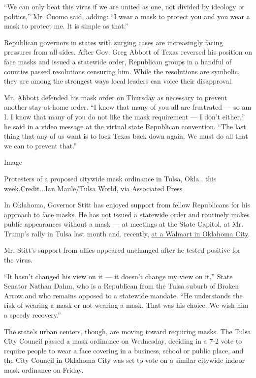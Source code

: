 ``We can only beat this virus if we are united as one, not divided by
ideology or politics,'' Mr. Cuomo said, adding: ``I wear a mask to
protect you and you wear a mask to protect me. It is simple as that.''

Republican governors in states with surging cases are increasingly
facing pressures from all sides. After Gov. Greg Abbott of Texas
reversed his position on face masks and issued a statewide order,
Republican groups in a handful of counties passed resolutions censuring
him. While the resolutions are symbolic, they are among the strongest
ways local leaders can voice their disapproval.

Mr. Abbott defended his mask order on Thursday as necessary to prevent
another stay-at-home order. ``I know that many of you all are frustrated
--- so am I. I know that many of you do not like the mask requirement
--- I don't either,'' he said in a video message at the virtual state
Republican convention. ``The last thing that any of us want is to lock
Texas back down again. We must do all that we can to prevent that.''

Image

Protesters of a proposed citywide mask ordinance in Tulsa, Okla., this
week.Credit...Ian Maule/Tulsa World, via Associated Press

In Oklahoma, Governor Stitt has enjoyed support from fellow Republicans
for his approach to face masks. He has not issued a statewide order and
routinely makes public appearances without a mask --- at meetings at the
State Capitol, at Mr. Trump's rally in Tulsa last month and, recently,
\href{https://kfor.com/news/local/oklahoma-governor-kevin-stitt-says-he-tested-positive-for-covid-19/}{at
a Walmart in Oklahoma City}.

Mr. Stitt's support from allies appeared unchanged after he tested
positive for the virus.

``It hasn't changed his view on it --- it doesn't change my view on
it,'' State Senator Nathan Dahm, who is a Republican from the Tulsa
suburb of Broken Arrow and who remains opposed to a statewide mandate.
``He understands the risk of wearing a mask or not wearing a mask. That
was his choice. We wish him a speedy recovery.''

The state's urban centers, though, are moving toward requiring masks.
The Tulsa City Council passed a mask ordinance on Wednesday, deciding in
a 7-2 vote to require people to wear a face covering in a business,
school or public place, and the City Council in Oklahoma City was set to
vote on a similar citywide indoor mask ordinance on Friday.

